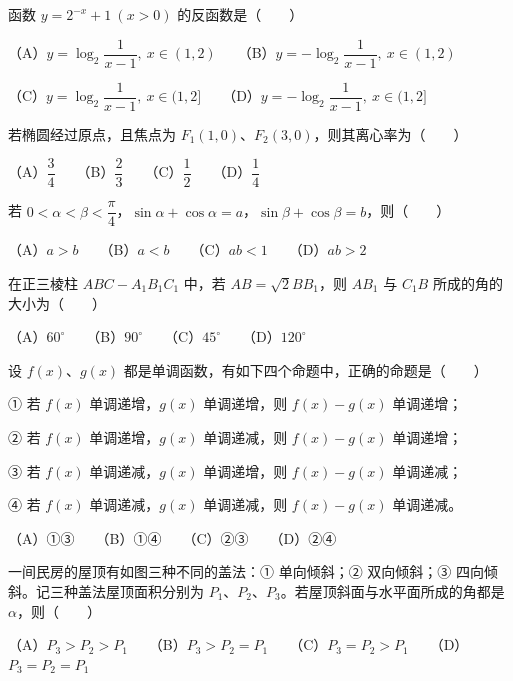 \begin{question}
函数 $y=2^{-x}+1\ (x>0)$ 的反函数是\mbox{（　　）}

（A）$y=\log_2\dfrac1{x-1},\ x\in(1,2)$　　（B）$y=-\log_2\dfrac1{x-1},\ x\in(1,2)$

（C）$y=\log_2\dfrac1{x-1},\ x\in(1,2]$　　（D）$y=-\log_2\dfrac1{x-1},\ x\in(1,2]$

\end{question}
\begin{question}
若椭圆经过原点，且焦点为 $F_1(1,0)$、$F_2(3,0)$，则其离心率为\mbox{（　　）}

（A）$\dfrac34$　　（B）$\dfrac23$　　（C）$\dfrac12$　　（D）$\dfrac14$

\end{question}
\begin{question}
若 $0<\alpha<\beta<\dfrac\pi4$，$\sin\alpha+\cos\alpha=a$，$\sin\beta+\cos\beta=b$，则\mbox{（　　）}

（A）$a>b$　　（B）$a<b$　　（C）$ab<1$　　（D）$ab>2$

\end{question}
\begin{question}
在正三棱柱 $ABC-A_1B_1C_1$ 中，若 $AB=\sqrt2BB_1$，则 $AB_1$ 与 $C_1B$ 所成的角的大小为\mbox{（　　）}

（A）$60^\circ$　　（B）$90^\circ$　　（C）$45^\circ$　　（D）$120^\circ$

\end{question}
\begin{question}
设 $f(x)$、$g(x)$ 都是单调函数，有如下四个命题中，正确的命题是\mbox{（　　）}

① 若 $f(x)$ 单调递增，$g(x)$ 单调递增，则 $f(x)-g(x)$ 单调递增；

② 若 $f(x)$ 单调递增，$g(x)$ 单调递减，则 $f(x)-g(x)$ 单调递增；

③ 若 $f(x)$ 单调递减，$g(x)$ 单调递增，则 $f(x)-g(x)$ 单调递减；

④ 若 $f(x)$ 单调递减，$g(x)$ 单调递减，则 $f(x)-g(x)$ 单调递减。

（A）①③　　（B）①④　　（C）②③　　（D）②④

\Needspace{0.4\textheight}
\end{question}
\begin{question}
一间民房的屋顶有如图三种不同的盖法：① 单向倾斜；② 双向倾斜；③ 四向倾斜。记三种盖法屋顶面积分别为 $P_1$、$P_2$、$P_3$。若屋顶斜面与水平面所成的角都是 $\alpha$，则\mbox{（　　）}
\nopagebreak[4]
\begin{center}\end{center}
\nopagebreak[4]
（A）$P_3>P_2>P_1$　　（B）$P_3>P_2=P_1$　　（C）$P_3=P_2>P_1$　　（D）$P_3=P_2=P_1$

\Needspace{0.4\textheight}
\end{question}
